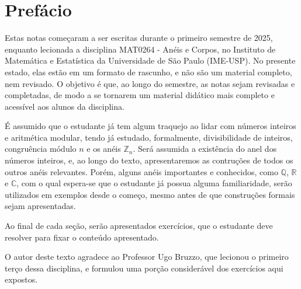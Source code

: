 \chapter{Prefácio}

Estas notas começaram a ser escritas durante o primeiro semestre de 2025, enquanto lecionada a disciplina MAT0264 - Anéis e Corpos, no Instituto de Matemática e Estatística da Universidade de São Paulo (IME-USP).
No presente estado, elas estão em um formato de rascunho, e não são um material completo, nem revisado. O objetivo é que, ao longo do semestre, as notas sejam revisadas e completadas, de modo a se tornarem um material didático mais completo e acessível aos alunos da disciplina.

É assumido que o estudante já tem algum traquejo ao lidar com números inteiros e aritmética modular, tendo já estudado, formalmente, divisibilidade de inteiros, congruência módulo $n$ e os anéis $\mathbb Z_n$.
Será assumida a existência do anel dos números inteiros, e, ao longo do texto, apresentaremos as contruções de todos os outros anéis relevantes.
Porém, alguns anéis importantes e conhecidos, como $\mathbb Q$, $\mathbb R$ e $\mathbb C$, com o qual espera-se que o estudante já possua alguma familiaridade, serão utilizados em exemplos desde o começo, mesmo antes de que construções formais sejam apresentadas.

Ao final de cada seção, serão apresentados exercícios, que o estudante deve resolver para fixar o conteúdo apresentado.

O autor deste texto agradece ao Professor Ugo Bruzzo, que lecionou o primeiro terço dessa disciplina, e formulou uma porção considerável dos exercícios aqui expostos.
